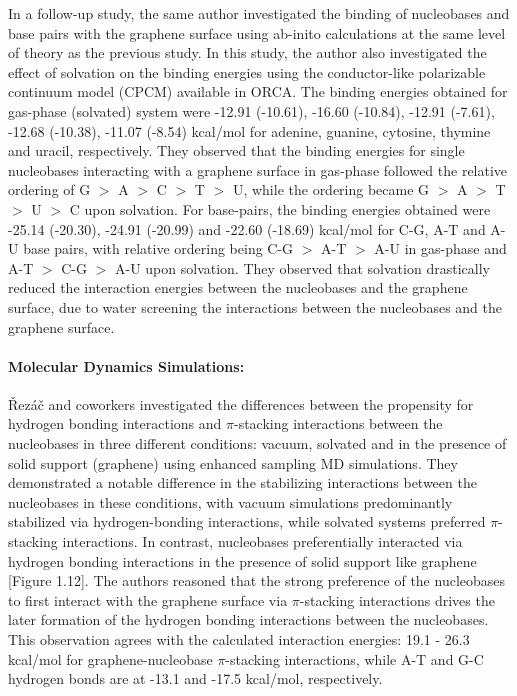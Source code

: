 In a follow-up study\supercite{cortes-arriagada_intermolecular_2021}, the same author investigated the binding of nucleobases and base pairs with the graphene surface using ab-inito calculations at the same level of theory as the previous study\supercite{cortes-arriagada_phosphorene_2018}. In this study, the author also investigated the effect of solvation on the binding energies using the conductor-like polarizable continuum model (CPCM) available in ORCA. The binding energies obtained for gas-phase (solvated) system were -12.91 (-10.61), -16.60 (-10.84), -12.91 (-7.61), -12.68 (-10.38), -11.07 (-8.54) kcal/mol for adenine, guanine, cytosine, thymine and uracil, respectively. They observed that the binding energies for single nucleobases interacting with a graphene surface in gas-phase followed the relative ordering of G $>$ A $>$  C $>$ T $>$ U, while the ordering became  G $>$ A $>$  T $>$ U $>$ C upon solvation. For base-pairs, the binding energies obtained were -25.14 (-20.30), -24.91 (-20.99) and -22.60 (-18.69) kcal/mol for C-G, A-T and A-U base pairs, with relative ordering being C-G $>$ A-T $>$ A-U in gas-phase and  A-T $>$ C-G $>$ A-U upon solvation. They observed that solvation drastically reduced the interaction energies between the nucleobases and the graphene surface, due to water screening the interactions between the nucleobases and the graphene surface. 

\paragraph{Molecular Dynamics Simulations:} Řezáč and coworkers investigated the differences between the propensity for hydrogen bonding interactions and $\pi$-stacking interactions between the nucleobases in three different conditions: vacuum, solvated and in the presence of solid support (graphene) using enhanced sampling MD simulations.\supercite{spiwok_free-energy_2011} They demonstrated a notable difference in the stabilizing interactions between the nucleobases in these conditions, with vacuum simulations predominantly stabilized via hydrogen-bonding interactions, while solvated systems preferred $\pi$-stacking interactions. In contrast, nucleobases preferentially interacted via hydrogen bonding interactions in the presence of solid support like graphene [Figure 1.12]. The authors reasoned that the strong preference of the nucleobases to first interact with the graphene surface via $\pi$-stacking interactions drives the later formation of the hydrogen bonding interactions between the nucleobases. This observation agrees with the calculated interaction energies: 19.1 - 26.3 kcal/mol for graphene-nucleobase $\pi$-stacking interactions, while A-T and G-C hydrogen bonds are at -13.1 and -17.5 kcal/mol, respectively.

